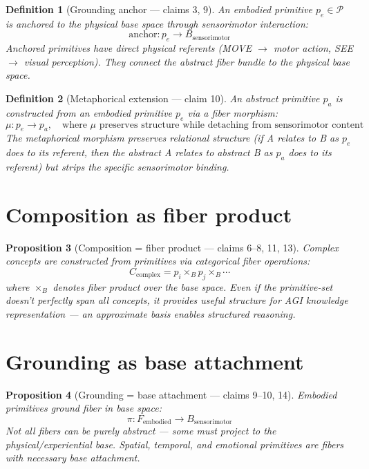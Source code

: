 \documentclass[11pt,a4paper]{article}
\newtheorem{definition}{Definition}[section]
\newtheorem{proposition}[definition]{Proposition}
\begin{document}
\begin{definition}[Grounding anchor --- claims 3, 9]
An \emph{embodied primitive} $p_e \in \mathcal{P}$ is anchored to the
physical base space through sensorimotor interaction:
\[
  \text{anchor}: p_e \to B_{\text{sensorimotor}}
\]
Anchored primitives have direct physical referents (MOVE $\to$ motor
action, SEE $\to$ visual perception). They connect the abstract fiber
bundle to the physical base space.
\end{definition}

\begin{definition}[Metaphorical extension --- claim 10]
An \emph{abstract primitive} $p_a$ is constructed from an embodied
primitive $p_e$ via a fiber morphism:
\[
  \mu: p_e \to p_a, \quad \text{where } \mu \text{ preserves structure}
  \text{ while detaching from sensorimotor content}
\]
The metaphorical morphism preserves relational structure (if A relates
to B as $p_e$ does to its referent, then the abstract A relates to
abstract B as $p_a$ does to its referent) but strips the specific
sensorimotor binding.
\end{definition}


\section{Composition as fiber product}

\begin{proposition}[Composition = fiber product --- claims 6--8, 11, 13]
Complex concepts are constructed from primitives via categorical fiber
operations:
\[
  C_{\text{complex}} = p_i \times_B p_j \times_B \cdots
\]
where $\times_B$ denotes fiber product over the base space. Even if the
primitive-set doesn't perfectly span all concepts, it provides useful
structure for AGI knowledge representation --- an approximate basis
enables structured reasoning.
\end{proposition}

\section{Grounding as base attachment}

\begin{proposition}[Grounding = base attachment --- claims 9--10, 14]
Embodied primitives ground fiber in base space:
\[
  \pi: F_{\text{embodied}} \to B_{\text{sensorimotor}}
\]
Not all fibers can be purely abstract --- some must project to the
physical/experiential base. Spatial, temporal, and emotional primitives
are fibers with necessary base attachment.
\end{proposition}
\end{document}
